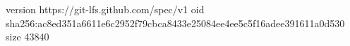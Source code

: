 version https://git-lfs.github.com/spec/v1
oid sha256:ac8ed351a6611e6c2952f79cbca8433e25084ee4ee5c5f16adee391611a0d530
size 43840
